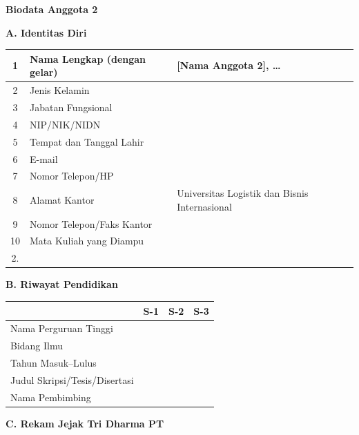 \newpage

\textbf{Biodata Anggota 2}

\textbf{A. Identitas Diri}
\begin{table}[h]
    \begin{tabularx}{\textwidth}{|c|X|X|}
        \hline
        1 & Nama Lengkap (dengan gelar) & {[Nama Anggota 2]}, \ldots \\ \hline
        2 & Jenis Kelamin & \\ \hline
        3 & Jabatan Fungsional & \\ \hline
        4 & NIP/NIK/NIDN & \\ \hline
        5 & Tempat dan Tanggal Lahir & \\ \hline
        6 & E-mail & \\ \hline
        7 & Nomor Telepon/HP & \\ \hline
        8 & Alamat Kantor & Universitas Logistik dan Bisnis Internasional \\ \hline
        9 & Nomor Telepon/Faks Kantor & \\ \hline
        10 & Mata Kuliah yang Diampu & \begin{tabular}[t]{@{}l@{}} 1. \\ 2. \end{tabular} \\ \hline
    \end{tabularx}
\end{table}

\textbf{B. Riwayat Pendidikan}
\begin{table}[h]
    \begin{tabularx}{\textwidth}{|X|X|X|X|}
        \hline
        & \textbf{S-1} & \textbf{S-2} & \textbf{S-3} \\ \hline
        Nama Perguruan Tinggi & & & \\ \hline
        Bidang Ilmu & & & \\ \hline
        Tahun Masuk--Lulus & & & \\ \hline
        Judul Skripsi/Tesis/Disertasi & & & \\ \hline
        Nama Pembimbing & & & \\ \hline
    \end{tabularx}
\end{table}

\textbf{C. Rekam Jejak Tri Dharma PT}

